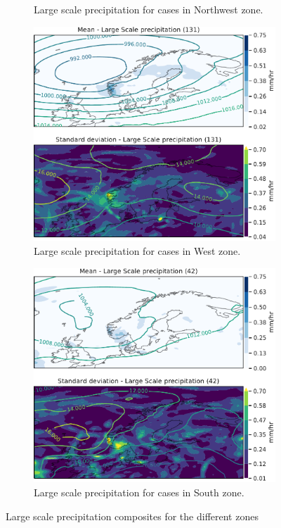 \begin{figure}
\begin{subfigure}[b]{0.49\textwidth}
    \caption{Large scale precipitation for cases in Northwest zone.}
    \label{fig:NordWestlsP}
\end{subfigure}
\begin{subfigure}[b]{0.49\textwidth}
    \centering
    \includegraphics[width=\textwidth]{Figures/lsPVest.pdf}
    \caption{Large scale precipitation for cases in West zone.}
    \label{fig:WestlsP}
\end{subfigure}
\begin{subfigure}[b]{0.49\textwidth}
    \centering
    \includegraphics[width=\textwidth]{Figures/lsPSor.pdf}
    \caption{Large scale precipitation for cases in South zone.}
    \label{fig:SouthlsP}
\end{subfigure}
\caption{Large scale precipitation composites for the different zones}
\label{fig:largescalezones}
\end{figure}

